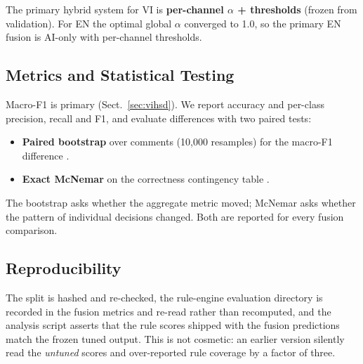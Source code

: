The primary hybrid system for VI is \textbf{per-channel $\alpha$ + thresholds}
(frozen from validation).  For EN the optimal global $\alpha$ converged to
1.0, so the primary EN fusion is AI-only with per-channel thresholds.

\subsection{Metrics and Statistical Testing}
\label{sec:metrics}

Macro-F1 is primary (Sect.~\ref{sec:vihsd}).  We report accuracy and per-class
precision, recall and F1, and evaluate differences with two paired tests:
\begin{itemize}
    \item \textbf{Paired bootstrap} over comments (10,000 resamples) for the
          macro-F1 difference \cite{efron1993bootstrap}.
    \item \textbf{Exact McNemar} on the correctness contingency table
          \cite{mcnemar1947note}.
\end{itemize}
The bootstrap asks whether the aggregate metric moved; McNemar asks whether
the pattern of individual decisions changed.  Both are reported for every
fusion comparison.

\subsection{Reproducibility}
\label{sec:repro}

The split is hashed and re-checked, the rule-engine evaluation directory is
recorded in the fusion metrics and re-read rather than recomputed, and the
analysis script asserts that the rule scores shipped with the fusion
predictions match the frozen tuned output.  This is not cosmetic: an earlier
version silently read the \emph{untuned} scores and over-reported rule
coverage by a factor of three.